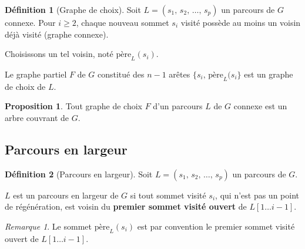 \documentclass[11pt,english,french]{scrreprt}
\theoremstyle{remark}
\newtheorem*{rem*}{Remarque}
\theoremstyle{definition}
\newtheorem*{def*}{Définition}
\newtheorem*{prop*}{Proposition}
\begin{document}
\begin{def*}[Graphe de choix]
	Soit $L=(s_1,\,s_2,\,\dots,\,s_p)$ un parcours de $G$ connexe. Pour $i\geqslant 2$, chaque nouveau sommet $s_i$ visité possède au moins un voisin déjà visité (graphe connexe).
	
	Choisissons un tel voisin, noté $\textrm{père}_L(s_i)$.
	
	Le graphe partiel $F$ de $G$ constitué des $n-1$ arêtes $\{s_i,\,\textrm{père}_L(s_i\}$ est un graphe de choix de $L$.
\end{def*}

\begin{prop*}
	Tout graphe de choix $F$ d'un parcours $L$ de $G$ connexe est un arbre couvrant de $G$.
\end{prop*}

\subsection{Parcours en largeur} %
\begin{def*}[Parcours en largeur]
	Soit $L=(s_1,\,s_2,\,\dots,\,s_p)$ un parcours de $G$.
	
	$L$ est un parcours en largeur de $G$ si tout sommet visité $s_i$, qui n'est pas un point de régénération, est voisin du \textbf{premier sommet visité ouvert} de $L[1\dots i-1]$.
\end{def*}

\begin{rem*}
	Le sommet $\textrm{père}_L(s_i)$ est par convention le premier sommet visité ouvert de $L[1\dots i-1]$.
\end{rem*}

\begin{algorithm} 
	\DontPrintSemicolon 
	\caption{Parcours en largeur} 
\end{algorithm}
\end{document}
